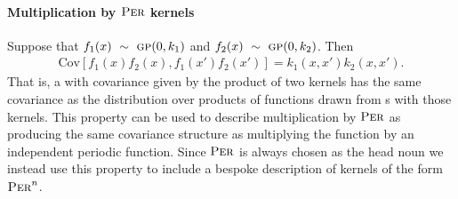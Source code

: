 \documentclass[letterpaper]{article}
\begin{document}

\paragraph{Multiplication by ${\textsc{Per}}$ kernels}
Suppose that ${f_1(x) \ \sim\  {\textsc{gp}}{}(0, k_1)}$ and ${f_2(x) \ \sim\  {\textsc{gp}}{}(0, k_2)}$.
Then
\begin{align}
{\textrm{Cov} \left[f_1(x)f_2(x), f_1(x')f_2(x') \right] = k_1(x,x')k_2(x,x')}.
\end{align}
That is, a \gp{} with covariance given by the product of two kernels has the same covariance as the distribution over products of functions drawn from \gp{}s with those kernels.
%
%
This property can be used to describe multiplication by ${\textsc{Per}}$ as producing the same covariance structure as multiplying the function by an independent periodic function.
Since ${\textsc{Per}}$ is always chosen as the head noun we instead use this property to include a bespoke description of kernels of the form ${\textsc{Per}}^n$.



\end{document}
